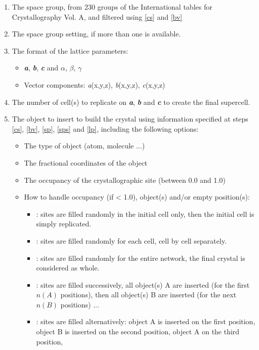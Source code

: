 \begin{enumerate}
\begin{minipage}{5cm}
\end{minipage}
\item\label{sp} The space group, from 230 groups of the International tables for Crystallography Vol. A, \cite{IucrA}
and filtered using \ref{cs} and \ref{bv}
\item\label{sps} The space group setting, if more than one is available.
\item\label{lp} The format of the lattice parameters:
\begin{itemize}
\item {\bf{\textit{a}}}, {\bf{\textit{b}}}, {\bf{\textit{c}}} and $\alpha$, $\beta$, $\gamma$
\item Vector components: {\it{a}}(x,y,z), {\it{b}}(x,y,z), {\it{c}}(x,y,z)
\end{itemize}
\item The number of cell(s) to replicate on {\bf{\textit{a}}}, {\bf{\textit{b}}} and {\bf{\textit{c}}} to create the final supercell. 
\item The object to insert to build the crystal using information specified at steps \ref{cs}, \ref{bv}, \ref{sp}, \ref{sps} and \ref{lp},
including the following options:
\begin{itemize}
\item The type of object (atom, molecule ...)
\item The fractional coordinates of the object
\item The occupancy of the crystallographic site (between 0.0 and 1.0)
\item How to handle occupancy (if < 1.0), object(s) and/or empty position(s):
\begin{itemize}
\item {}: sites are filled randomly in the initial cell only, then the initial cell is simply replicated.
\item {}: sites are filled randomly for each cell, cell by cell separately.
\item {}: sites are filled randomly for the entire network, the final crystal is considered as whole.
\item {}: sites are filled successively, all object(s) A are inserted (for the first $n(A)$ positions), then all object(s) B are inserted (for the next $n(B)$ positions) ...  
\item {}: sites are filled alternatively: object A is inserted on the first position, object B is inserted on the second position, object A on the third position, 

\end{itemize}
\end{itemize}
\end{enumerate}
